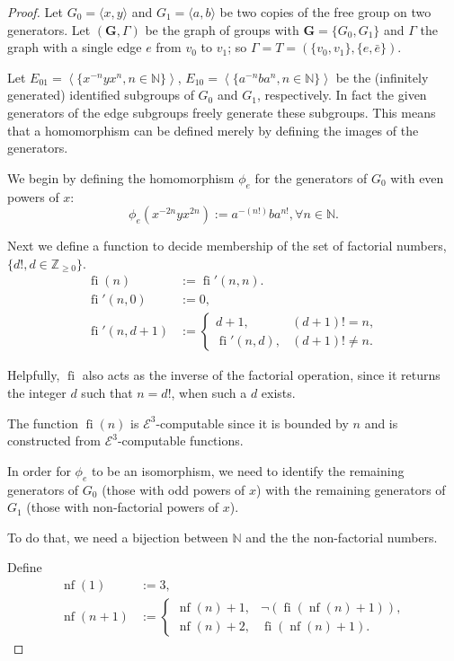 \documentclass[a4paper]{article}
\newcommand{\grz}[1]{$\mathcal{E}^{#1}$}	%
\newcommand{\NN}{\mathbb{N}}	%
\newcommand{\Zpos}{\mathbb{Z}_{\geq 0}}
\newcommand{\recur}[1]{\begin{equation} \begin{split} #1 \end{split} \end{equation}}	%
\theoremstyle{plain}
\theoremstyle{definition}
\begin{document}
\begin{proof}
Let $G_0 = \langle x,y \rangle$ and $G_1 = \langle a,b \rangle$  
be two copies of the free group on two generators. Let $(\mathbf{G},\Gamma)$
 be the graph of groups with $\mathbf{G} = \{G_0,G_1\}$ and $\Gamma$ the 
graph
with a single edge $e$ from $v_0$ to $v_1$; so $\Gamma = T = (\{v_0,v_1\},\{e,\bar{e}\})$.

Let $E_{01} = \left \langle \{x^{-n}yx^n, n \in \mathbb{N} \} \right \rangle$, 
$E_{10} = \left\langle \{ a^{-n}ba^n, n \in \mathbb{N} \} \right\rangle$ be the 
(infinitely generated) identified subgroups of $G_0$ and $G_1$, respectively.
In fact the given generators of the edge subgroups freely generate
these subgroups. This means that a homomorphism can be defined merely
by defining the images of the generators.

We begin by defining the homomorphism $\phi_e$ for the generators of $G_0$ with even powers of $x$:
\[	\phi_{e}(x^{-2n}yx^{2n}) := a^{-(n!)}ba^{n!}, \forall n \in \NN. \]

Next we define a function to decide membership of the set of factorial numbers, $\{d!, d \in \Zpos\}$. \recur{
\operatorname{fi}(n) &:= \operatorname{fi}'(n,n).\\
\operatorname{fi}'(n,0) &:= 0, \\
\operatorname{fi}'(n,d+1) &:= 
	\begin{cases} 
		d+1, & (d+1)! = n, \\
		\operatorname{fi}'(n,d), & (d+1)! \neq n.
	\end{cases}
}

Helpfully, $\operatorname{fi}$ also acts as the inverse of the factorial operation, since it returns the integer $d$ such that $n = d!$, when such a $d$ exists.

The function $\operatorname{fi}(n)$ is \grz{3}-computable since it is bounded by $n$ and is constructed from \grz{3}-computable functions.

In order for $\phi_e$ to be an isomorphism, we need to identify the remaining generators of $G_0$ (those with odd powers of $x$) with the remaining generators of $G_1$ (those with non-factorial powers of $x$).

To do that, we need a bijection between $\NN$ and the the non-factorial numbers.

Define 
\recur{
	\operatorname{nf}(1) &:= 3, \\
	\operatorname{nf}(n+1) &:= 
		\begin{cases}
			\operatorname{nf}(n)+1, & \neg(\operatorname{fi}(\operatorname{nf}(n)+1)), \\
			\operatorname{nf}(n)+2, & \operatorname{fi}(\operatorname{nf}(n)+1).
		\end{cases}
}


\end{proof}
\end{document}
